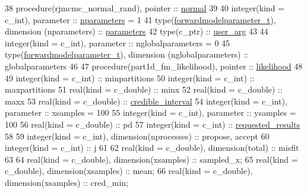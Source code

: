 \begin{DoxyCodeInclude}
38 \textcolor{keywordtype}{procedure}(rjmcmc\_normal\_rand), \textcolor{keywordtype}{pointer} :: \hyperlink{rjmcmcf__mpi_8h_a6304ff7c79f9217c47a3373e460e3cfc}{normal}
39 
40 \textcolor{keywordtype}{integer(kind = c\_int)}, \textcolor{keywordtype}{parameter} :: \hyperlink{rjmcmcf__mpi_8h_ad1c48db951dfa8787a94c0c56ae60e13}{nparameters} = 1
41 \textcolor{keywordtype}{type}(\hyperlink{forwardmodelparameter_8h_a18a7d2fd51fab097145725d83ac328e3}{forwardmodelparameter\_t}), \textcolor{keywordtype}{dimension (nparameters)} :: 
      \hyperlink{rjmcmcf__mpi_8h_af69ab156c03e104279d5e0cb70a0d4c4}{parameters}
42 \textcolor{keywordtype}{type}(c\_ptr) :: \hyperlink{rjmcmcf__mpi_8h_ab68b3a27bfe943a73cf680c2e439e070}{user\_arg}
43 
44 \textcolor{keywordtype}{integer(kind = c\_int)}, \textcolor{keywordtype}{parameter} :: nglobalparameters = 0
45 \textcolor{keywordtype}{type}(\hyperlink{forwardmodelparameter_8h_a18a7d2fd51fab097145725d83ac328e3}{forwardmodelparameter\_t}), \textcolor{keywordtype}{dimension (nglobalparameters)} :: globalparameters
46 
47 \textcolor{keywordtype}{procedure}(part1d\_fm\_likelihood), \textcolor{keywordtype}{pointer} :: \hyperlink{rjmcmcf__mpi_8h_a1f8ef761c1c5dea3f15f637135c162db}{likelihood}
48 
49 \textcolor{keywordtype}{integer(kind = c\_int)} :: minpartitions
50 \textcolor{keywordtype}{integer(kind = c\_int)} :: maxpartitions
51 \textcolor{keywordtype}{real(kind = c\_double)} :: minx
52 \textcolor{keywordtype}{real(kind = c\_double)} :: maxx
53 \textcolor{keywordtype}{real(kind = c\_double)} :: \hyperlink{rjmcmcf__mpi_8h_a5a7722a5cc210713ec1b3956fde06e70}{credible\_interval}
54 \textcolor{keywordtype}{integer(kind = c\_int)}, \textcolor{keywordtype}{parameter} :: xsamples = 100
55 \textcolor{keywordtype}{integer(kind = c\_int)}, \textcolor{keywordtype}{parameter} :: ysamples = 100
56 \textcolor{keywordtype}{real(kind = c\_double)} :: pd
57 \textcolor{keywordtype}{integer(kind = c\_int)} :: \hyperlink{rjmcmcf__mpi_8h_a141ddf12f08f2f9e95036a6cd06324ff}{requested\_results}
58 
59 \textcolor{keywordtype}{integer(kind = c\_int)}, \textcolor{keywordtype}{dimension(nprocesses)} :: propose, accept
60 \textcolor{keywordtype}{integer(kind = c\_int)} :: j
61 
62 \textcolor{keywordtype}{real(kind = c\_double)}, \textcolor{keywordtype}{dimension(total)} :: misfit
63 
64 \textcolor{keywordtype}{real(kind = c\_double)}, \textcolor{keywordtype}{dimension(xsamples)} :: sampled\_x;
65 \textcolor{keywordtype}{real(kind = c\_double)}, \textcolor{keywordtype}{dimension(xsamples)} :: mean;
66 \textcolor{keywordtype}{real(kind = c\_double)}, \textcolor{keywordtype}{dimension(xsamples)} :: cred\_min;

\end{DoxyCodeInclude}
